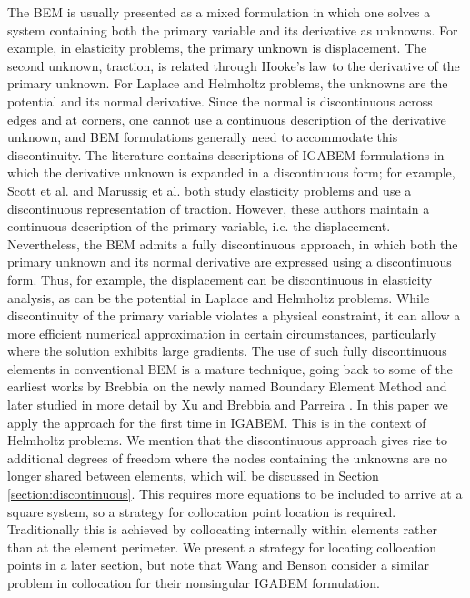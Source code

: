 \documentclass[review]{elsarticle}
\begin{document}
The BEM is usually presented as a mixed formulation in which one solves a system containing both the primary variable and its derivative as unknowns. For example, in elasticity problems, the primary unknown is displacement. The second unknown, traction, is related through Hooke’s law to the derivative of the primary unknown. For Laplace and Helmholtz problems, the unknowns are the potential and its normal derivative. Since the normal is discontinuous across edges and at corners, one cannot use a continuous description of the derivative unknown, and BEM formulations generally need to accommodate this discontinuity. The literature contains descriptions of IGABEM formulations in which the derivative unknown is expanded in a discontinuous form; for example, Scott et al. \cite{Scott} and Marussig et al. \cite{MARUSSIG2015458} both study elasticity problems and use a discontinuous representation of traction. However, these authors maintain a continuous description of the primary variable, i.e. the displacement. Nevertheless, the BEM admits a fully discontinuous approach, in which both the primary unknown and its normal derivative are expressed using a discontinuous form. Thus, for example, the displacement can be discontinuous in elasticity analysis, as can be the potential in Laplace and Helmholtz problems. While discontinuity of the primary variable violates a physical constraint, it can allow a more efficient numerical approximation in certain circumstances, particularly where the solution exhibits large gradients. The use of such fully discontinuous elements in conventional BEM is a mature technique, going back to some of the earliest works by Brebbia on the newly named Boundary Element Method \cite{brebbia1977boundary} and later studied in more detail by Xu and Brebbia \cite{Xu1986} and Parreira \cite{PARREIRA1988205}. In this paper we apply the approach for the first time in IGABEM. This is in the context of Helmholtz problems. We mention that the discontinuous approach gives rise to additional degrees of freedom where the nodes containing the unknowns are no longer shared between elements, which will be discussed in Section \ref{section:discontinuous}. This requires more equations to be included to arrive at a square system, so a strategy for collocation point location is required. Traditionally this is achieved by collocating internally within elements rather than at the element perimeter. We present a strategy for locating collocation points in a later section, but note that Wang and Benson \cite{YWang} consider a similar problem in collocation for their nonsingular IGABEM formulation.
\end{document}
